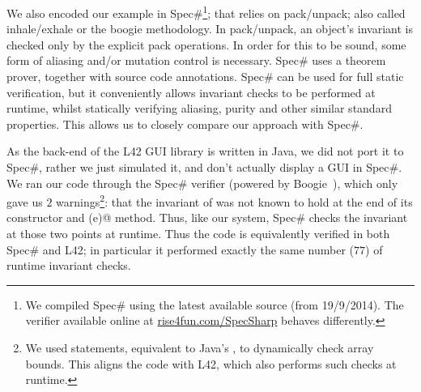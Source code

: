 

We also encoded our example in Spec\#\footnote{We compiled Spec\# using the latest available source (from 19/9/2014). The verifier available online at \url{rise4fun.com/SpecSharp} behaves differently.}; that relies on pack/unpack; also called inhale/exhale or the boogie methodology.
In pack/unpack, an object's invariant is checked only by the explicit pack operations.
In order for this to be sound, some form of aliasing and/or mutation control is necessary. Spec\# uses a theorem prover, together with source code annotations.
Spec\# can be used for full static verification, but it conveniently allows invariant checks to be performed at runtime, whilst statically verifying aliasing, purity and other similar standard properties.
This allows us to closely compare our approach with Spec\#.

As the back-end of the L42 GUI library is written in Java, we did not port it to Spec\#, rather we just simulated it, and don't actually display a GUI in Spec\#.
We ran our code through the Spec\# verifier (powered by Boogie~\cite{DBLP:conf/fmco/BarnettCDJL05}), which only gave us $2$ warnings\footnote{We used \Q@assume@ statements, equivalent to Java's \Q@assert@, to dynamically check array bounds. %
This aligns the code with L42, which also performs such checks at runtime.}: that the invariant of \Q@SafeMovable@ was not known to hold at the end of its constructor and \Q@dispatch(e)@ method. Thus, like our system, Spec\# checks the invariant
at those two points at runtime. Thus the code is equivalently verified in both Spec\# and L42; in particular it performed exactly the same number ($77$) of runtime invariant checks.


